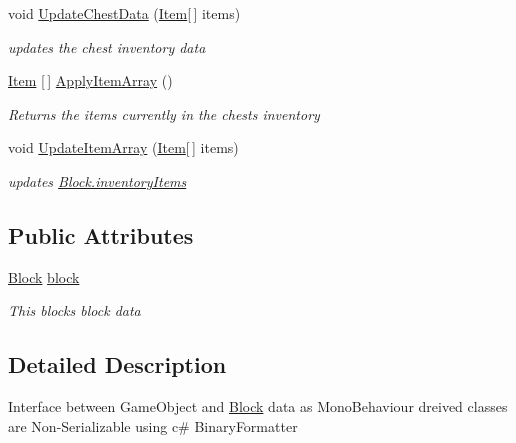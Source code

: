 \begin{DoxyCompactItemize}
void \hyperlink{class_bee_game_1_1_blocks_1_1_block_game_object_interface_a2e81344ecd9ed4dc9ce8b4a93b119ca2}{Update\+Chest\+Data} (\hyperlink{struct_bee_game_1_1_items_1_1_item}{Item}\mbox{[}$\,$\mbox{]} items)
\begin{DoxyCompactList}\small\item\em updates the chest inventory data \end{DoxyCompactList}\item 
\hyperlink{struct_bee_game_1_1_items_1_1_item}{Item} \mbox{[}$\,$\mbox{]} \hyperlink{class_bee_game_1_1_blocks_1_1_block_game_object_interface_a9e53e6213fec0b1f7a3ed16f50e3d894}{Apply\+Item\+Array} ()
\begin{DoxyCompactList}\small\item\em Returns the items currently in the chests inventory \end{DoxyCompactList}\item 
void \hyperlink{class_bee_game_1_1_blocks_1_1_block_game_object_interface_acecdd76ab9fd7639409fe29ebd29d4fd}{Update\+Item\+Array} (\hyperlink{struct_bee_game_1_1_items_1_1_item}{Item}\mbox{[}$\,$\mbox{]} items)
\begin{DoxyCompactList}\small\item\em updates \hyperlink{class_bee_game_1_1_blocks_1_1_block_a54846c7c7ec2f512484b3060de977fac}{Block.\+inventory\+Items} \end{DoxyCompactList}\end{DoxyCompactItemize}
\subsection*{Public Attributes}
\begin{DoxyCompactItemize}
\item 
\hyperlink{class_bee_game_1_1_blocks_1_1_block}{Block} \hyperlink{class_bee_game_1_1_blocks_1_1_block_game_object_interface_a238bad3b956ec84c8b1cc3127948b75d}{block}
\begin{DoxyCompactList}\small\item\em This blocks block data \end{DoxyCompactList}\end{DoxyCompactItemize}


\subsection{Detailed Description}
Interface between Game\+Object and \hyperlink{class_bee_game_1_1_blocks_1_1_block}{Block} data as Mono\+Behaviour dreived classes are Non-\/\+Serializable using c\# Binary\+Formatter 



